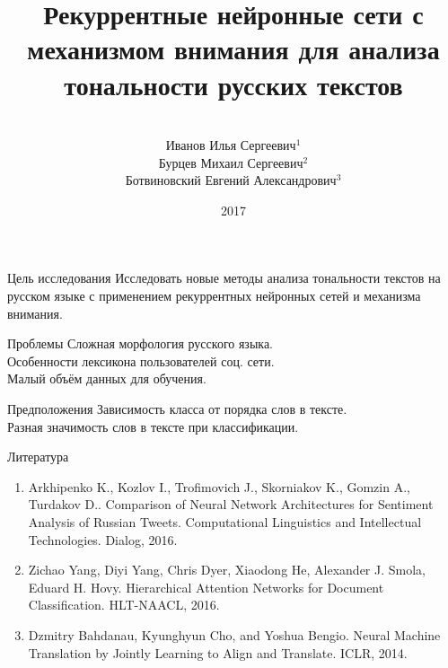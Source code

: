 \documentclass{beamer}
\title[\hbox to 56mm{\hfill\insertframenumber\,/\,\inserttotalframenumber}]
{Рекуррентные нейронные сети с механизмом внимания для анализа тональности русских текстов}
\author[И.\,С. Иванов]{\large \\Иванов Илья Сергеевич$^{1}$
\large \\Бурцев Михаил Сергеевич$^{2}$
\large \\Ботвиновский Евгений Александрович$^{3}$}
\institute{
$^{1}$студент, Московский Физико-Технический Институт\\
$^{2}$к.ф.-м.н., DeepHackLab\\
$^{3}$к.ф.-м.н., DeepHackLab\\
}
\date{2017}
\begin{document}
\nocite{*}
\begin{frame}
\titlepage
\end{frame}
\begin{frame}{Цель исследования}
Исследовать новые методы анализа тональности текстов на русском языке с применением рекуррентных нейронных сетей и механизма внимания.
\begin{block}{Проблемы}
	Сложная морфология русского языка.\\
	Особенности лексикона пользователей соц. сети.\\
	Малый объём данных для обучения.\\
\end{block}

\begin{block}{Предположения}
	Зависимость класса от порядка слов в тексте.\\
	Разная значимость слов в тексте при классификации.
\end{block}

\end{frame}
\begin{frame}{Литература}
	\begin{enumerate}
		\item Arkhipenko K., Kozlov I., Trofimovich J., Skorniakov K., Gomzin A., Turdakov D.. Comparison of Neural Network Architectures for Sentiment Analysis of Russian Tweets. Computational Linguistics and Intellectual Technologies. Dialog, 2016.	
		\item Zichao Yang, Diyi Yang, Chris Dyer, Xiaodong He, Alexander J. Smola, Eduard H. Hovy. Hierarchical Attention Networks for Document Classification. HLT-NAACL, 2016.
		\item Dzmitry Bahdanau, Kyunghyun Cho, and Yoshua Bengio. Neural Machine Translation by Jointly Learning to Align and Translate. ICLR, 2014.
	\end{enumerate}
\end{frame}
\end{document}
